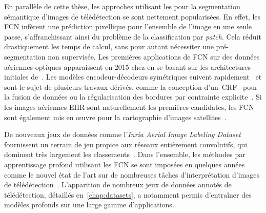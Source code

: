 En parallèle de cette thèse, les approches utilisant les  pour la segmentation sémantique d'images de télédétection se sont nettement popularisées. En effet, les \gls{FCN} infèrent une prédiction pixellique pour l'ensemble de l'image en une seule passe, s'affranchissant ainsi du problème de la classification par \emph{patch}. Cela réduit drastiquement les temps de calcul, sans pour autant nécessiter une pré-segmentation non supervisée. Les premières applications de \gls{FCN} sur des données aériennes optiques apparaissent en 2015 chez \citet{paisitkriangkrai_effective_2015,sherrah_fully_2016} en se basant sur les architectures initiales de~\citet{long_fully_2015}. Les modèles encodeur-décodeurs symétriques suivent rapidement~\cite{volpi_dense_2017,audebert_semantic_2016} et sont le sujet de plusieurs travaux dérivés, comme la conception d'un~\gls{CRF}~\cite{liu_dense_2017} pour la fusion de données ou la régularisation des bordures par contrainte explicite~\cite{marmanis_classification_2017}. Si les images aériennes \gls{EHR} sont naturellement les premières candidates, les \gls{FCN} sont également mis en \oe{}uvre pour la cartographie d'images satellites~\cite{fu_classification_2017}.

De nouveaux jeux de données comme l'\emph{Inria Aerial Image Labeling Dataset} fournissent un terrain de jeu propice aux réseaux entièrement convolutifs, qui dominent très largement les classements~\cite{huang_large-scale_2018}. Dans l'ensemble, les méthodes par apprentissage profond utilisant les \gls{FCN} se sont imposées en quelques années comme le nouvel état de l'art sur de nombreuses tâches d'interprétation d'images de télédétection~\cite{liu_comparing_2018}. L'apparition de nombreux jeux de données annotés de télédétection, détaillés en~\cref{chap:datasets}, a notamment permis d'entraîner des modèles profonds sur une large gamme d'applications.

%
%
\printbibliography[heading=subbibliography]
